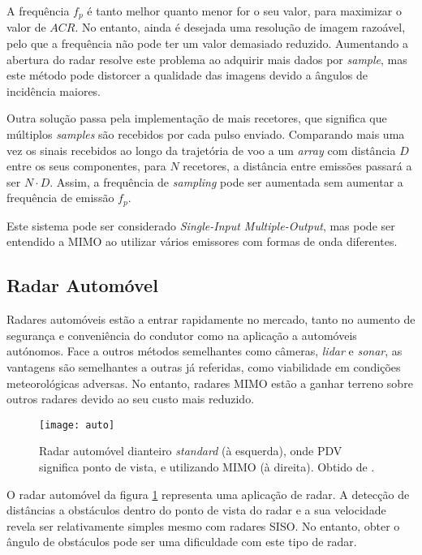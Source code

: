 \documentclass[purist,portuguese]{ist-report}
\begin{document}
A frequência $f_p$ é tanto melhor quanto menor for o seu valor, para maximizar o valor de $ACR$. No entanto, ainda é desejada uma resolução de imagem razoável, pelo que a frequência não pode ter um valor demasiado reduzido. Aumentando a abertura do radar resolve este problema ao adquirir mais dados por \textit{sample}, mas este método pode distorcer a qualidade das imagens devido a ângulos de incidência maiores.

Outra solução passa pela implementação de mais recetores, que significa que múltiplos \textit{samples} são recebidos por cada pulso enviado. Comparando mais uma vez os sinais recebidos ao longo da trajetória de voo a um \textit{array} com distância $D$ entre os seus componentes, para $N$ recetores, a distância entre emissões passará a ser $N \cdot D$. Assim, a frequência de \textit{sampling} pode ser aumentada sem aumentar a frequência de emissão $f_p$.

Este sistema pode ser considerado \textit{Single-Input Multiple-Output}, mas pode ser entendido a MIMO ao utilizar vários emissores com formas de onda diferentes.

\subsection{Radar Automóvel}

Radares automóveis estão a entrar rapidamente no mercado, tanto no aumento de segurança e conveniência do condutor como na aplicação a automóveis autónomos. Face a outros métodos semelhantes como câmeras, \textit{lidar} e \textit{sonar}, as vantagens são semelhantes a outras já referidas, como viabilidade em condições meteorológicas adversas. No entanto, radares MIMO estão a ganhar terreno sobre outros radares devido ao seu custo mais reduzido.

\begin{figure}[ht]
	\centering
	\texttt{[image: auto]}
	\caption{Radar automóvel dianteiro \textit{standard} (à esquerda), onde PDV significa ponto de vista, e utilizando MIMO (à direita). Obtido de \textit{\citeauthor{mimoradarbook}} \cite{mimoradarbook}.}
	\label{fig:autorad}
\end{figure}

O radar automóvel da figura \ref{fig:autorad} representa uma aplicação de radar. A detecção de distâncias a obstáculos dentro do ponto de vista do radar e a sua velocidade revela ser relativamente simples mesmo com radares SISO. No entanto, obter o ângulo de obstáculos pode ser uma dificuldade com este tipo de radar.
\end{document}
